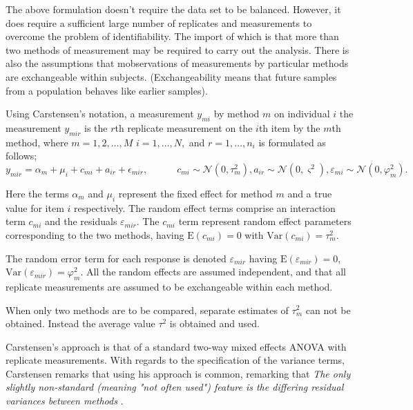 \documentclass{report}
\begin{document}
	The above formulation doesn't require the data set to be balanced.
	However, it does require a sufficient large number of replicates
	and measurements to overcome the problem of identifiability. The
	import of which is that more than two methods of measurement may
	be required to carry out the analysis. There is also the
	assumptions that mobservations of measurements by particular
	methods are exchangeable within subjects. (Exchangeability means
	that future samples from a population behaves like earlier
	samples).
	
	Using Carstensen's notation, a measurement $y_{mi}$ by method $m$ on individual $i$ the measurement $y_{mir} $ is the $r$th replicate measurement on the $i$th item by the $m$th method, where $m=1,2,\ldots,M$ $i=1,\ldots,N,$ and $r = 1,\ldots,n_i$ is formulated as follows;
	\begin{equation}
	y_{mir}  = \alpha_{m} + \mu_{i} + c_{mi} + a_{ir} + \epsilon_{mir}, \qquad \quad c_{mi} \sim \mathcal{N}(0,\tau^{2}_{m}) , a_{ir} \sim \mathcal{N}(0,\varsigma^{2}),  \varepsilon_{mi} \sim \mathcal{N}(0,\varphi^{2}_{m}) .
	\end{equation}
	
	Here the terms $\alpha_{m}$ and $\mu_{i}$ represent the fixed effect for method $m$ and a true value for item $i$ respectively. The random effect terms comprise an interaction term $c_{mi}$ and the residuals $\varepsilon_{mir}$.
	The $c_{mi}$ term represent random effect parameters corresponding to the two methods, having $\mathrm{E}(c_{mi})= 0$ with $\mathrm{Var}(c_{mi})=\tau^2_m$.  
	
	
	The random error term for each response is denoted $\varepsilon_{mir}$ having $\mathrm{E}(\varepsilon_{mir})=0$, $\mathrm{Var}(\varepsilon_{mir})=\varphi^2_m$. All the random effects are assumed independent, and that all replicate measurements are assumed to be exchangeable within each method.
	
	
	When only two methods are to be compared, separate estimates of $\tau^2_m$ can not be obtained. Instead the average value $\tau^2$ is obtained and used.
	
	
	Carstensen's approach is that of a standard two-way mixed effects ANOVA with replicate measurements. With regards to the specification of the variance terms, Carstensen remarks that using his approach is common, remarking that \emph{
		The only slightly non-standard (meaning "not often used") feature is the differing residual variances between methods }\citep{bxc2010}.
	
\end{document}
